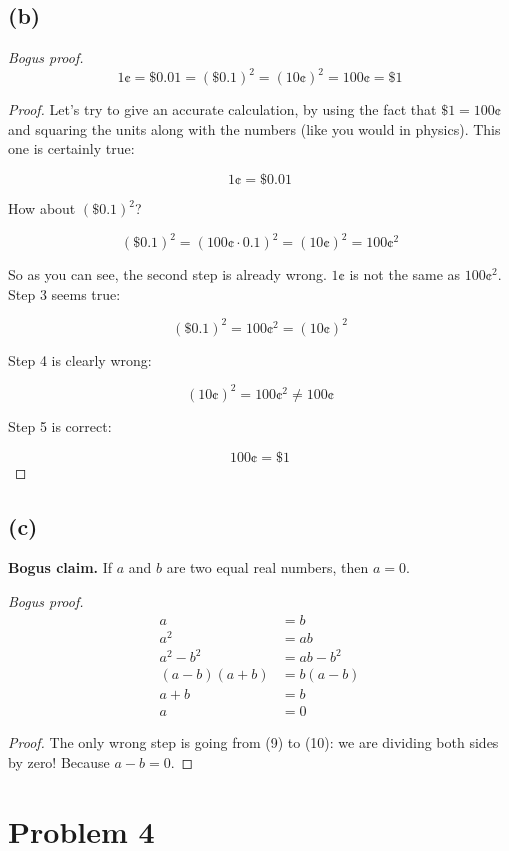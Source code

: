 \documentclass[14pt]{extarticle}
\begin{document}
\subsection{(b)}

{\it Bogus proof.}
$$
1 \cent = \$ 0.01 = (\$ 0.1)^2 = (10\cent)^2 = 100\cent = \$1
$$

\begin{proof}
Let's try to give an accurate calculation, by using the fact that $\$1 = 100\cent$ and squaring the units along with the numbers (like you would in physics). This one is certainly true:

$$
1 \cent = \$ 0.01
$$

How about $(\$ 0.1)^2$?

$$
(\$ 0.1)^2 = (100\cent \cdot 0.1)^2 = (10\cent)^2 = 100\cent^2
$$

So as you can see, the second step is already wrong. $1\cent$ is not the same as $100\cent^2$. 
Step 3 seems true:

$$
(\$ 0.1)^2 = 100\cent^2 = (10\cent)^2
$$

Step 4 is clearly wrong:

$$
(10\cent)^2 = 100\cent^2 \neq 100\cent
$$

Step 5 is correct:

$$
100\cent = \$1
$$
\end{proof}

\subsection{(c)} 

{\bf Bogus claim.} If $a$ and $b$ are two equal real numbers, then $a = 0$.

{\it Bogus proof.}
\begin{align}
a &=b  \\
a^2 &= ab\\
a^2-b^2 &= ab-b^2\\
(a-b)(a+b) &= b(a-b)\\
a+b &= b\\
a &= 0
\end{align}

\begin{proof}
The only wrong step is going from (9) to (10): we are dividing both sides by zero! Because $a - b= 0$.
\end{proof}

\section{Problem 4}
\end{document}
